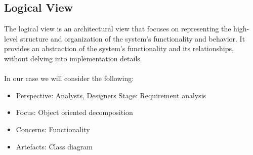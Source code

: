 \pagebreak

\subsection{Logical View\label{subSection::LogicalView}} 
The logical view is an architectural view that focuses on representing the high-level structure and organization of the system's functionality and behavior. It provides an abstraction of the system's functionality and its relationships, without delving into implementation details. \\\\
     In our case we will consider the following:
     \begin{itemize}
         \item Perspective: Analysts, Designers Stage: Requirement analysis 
         \item Focus: Object oriented decomposition
         \item Concerns: Functionality
         \item Artefacts: Class diagram \cite{UMLdiagram}
     \end{itemize}


